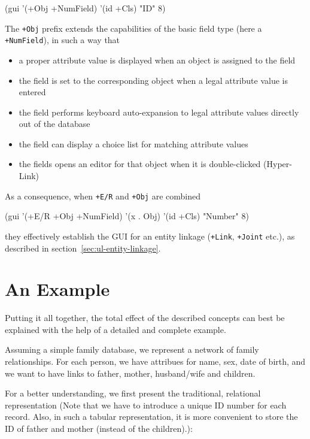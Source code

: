 \begin{wideverbatim}
(gui '(+Obj +NumField) '(id +Cls) "ID" 8)
\end{wideverbatim}

The \texttt{+Obj} prefix extends the capabilities of the basic field type (here
a \texttt{+NumField}), in such a way that

\begin{itemize}
\item a proper attribute value is displayed when an object is assigned to
   the field
\item the field is set to the corresponding object when a legal attribute
   value is entered
\item the field performs keyboard auto-expansion to legal attribute values
   directly out of the database
\item the field can display a choice list for matching attribute values
\item the fields opens an editor for that object when it is double-clicked
   (Hyper-Link)
\end{itemize}

As a consequence, when \texttt{+E/R} and \texttt{+Obj} are combined


\begin{wideverbatim}
(gui '(+E/R +Obj +NumField) '(x . Obj) '(id +Cls) "Number" 8)
\end{wideverbatim}

they effectively establish the GUI for an entity linkage (\texttt{+Link},
\texttt{+Joint} etc.), as described in section~\vref{sec:ul-entity-linkage}. 

 
\section{An Example}
\label{sec:an-example}

Putting it all together, the total effect of the described concepts can
best be explained with the help of a detailed and complete example.

Assuming a simple family database, we represent a network of family
relationships. For each person, we have attribues for name, sex, date of
birth, and we want to have links to father, mother, husband/wife and
children.

For a better understanding, we first present the traditional, relational
representation (Note that we have to introduce a unique ID number for
each record. Also, in such a tabular representation, it is more
convenient to store the ID of father and mother (instead of the
children).):


